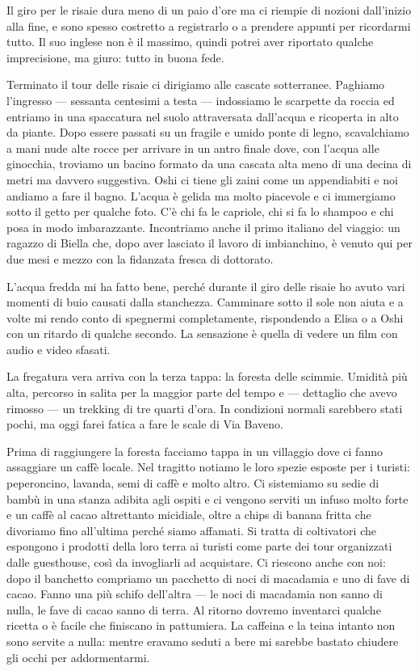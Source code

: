 Il giro per le risaie dura meno di un paio d'ore ma ci riempie di nozioni dall'inizio alla fine, e sono spesso costretto a registrarlo o a prendere appunti per ricordarmi tutto. Il suo inglese non è il massimo, quindi potrei aver riportato qualche imprecisione, ma giuro: tutto in buona fede.

Terminato il tour delle risaie ci dirigiamo alle cascate sotterranee. Paghiamo l'ingresso — sessanta centesimi a testa — indossiamo le scarpette da roccia ed entriamo in una spaccatura nel suolo attraversata dall'acqua e ricoperta in alto da piante. Dopo essere passati su un fragile e umido ponte di legno, scavalchiamo a mani nude alte rocce per arrivare in un antro finale dove, con l'acqua alle ginocchia, troviamo un bacino formato da una cascata alta meno di una decina di metri ma davvero suggestiva. Oshi ci tiene gli zaini come un appendiabiti e noi andiamo a fare il bagno. L'acqua è gelida ma molto piacevole e ci immergiamo sotto il getto per qualche foto. C'è chi fa le capriole, chi si fa lo shampoo e chi posa in modo imbarazzante. Incontriamo anche il primo italiano del viaggio: un ragazzo di Biella che, dopo aver lasciato il lavoro di imbianchino, è venuto qui per due mesi e mezzo con la fidanzata fresca di dottorato.

L'acqua fredda mi ha fatto bene, perché durante il giro delle risaie ho avuto vari momenti di buio causati dalla stanchezza. Camminare sotto il sole non aiuta e a volte mi rendo conto di spegnermi completamente, rispondendo a Elisa o a Oshi con un ritardo di qualche secondo. La sensazione è quella di vedere un film con audio e video sfasati.

La fregatura vera arriva con la terza tappa: la foresta delle scimmie. Umidità più alta, percorso in salita per la maggior parte del tempo e — dettaglio che avevo rimosso — un trekking di tre quarti d'ora. In condizioni normali sarebbero stati pochi, ma oggi farei fatica a fare le scale di Via Baveno.

Prima di raggiungere la foresta facciamo tappa in un villaggio dove ci fanno assaggiare un caffè locale. Nel tragitto notiamo le loro spezie esposte per i turisti: peperoncino, lavanda, semi di caffè e molto altro. Ci sistemiamo su sedie di bambù in una stanza adibita agli ospiti e ci vengono serviti un infuso molto forte e un caffè al cacao altrettanto micidiale, oltre a chips di banana fritta che divoriamo fino all'ultima perché siamo affamati. Si tratta di coltivatori che espongono i prodotti della loro terra ai turisti come parte dei tour organizzati dalle guesthouse, così da invogliarli ad acquistare. Ci riescono anche con noi: dopo il banchetto compriamo un pacchetto di noci di macadamia e uno di fave di cacao. Fanno una più schifo dell'altra — le noci di macadamia non sanno di nulla, le fave di cacao sanno di terra. Al ritorno dovremo inventarci qualche ricetta o è facile che finiscano in pattumiera. La caffeina e la teina intanto non sono servite a nulla: mentre eravamo seduti a bere mi sarebbe bastato chiudere gli occhi per addormentarmi.

